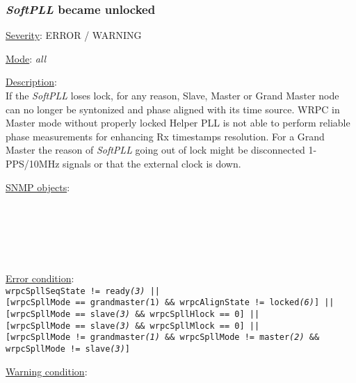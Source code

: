 \subsubsection{\bf \emph{SoftPLL} became unlocked}
		\label{fail:timing:spll_unlock}
		\begin{pck_descr}
			\item [] \underline{Severity}: ERROR / WARNING
			\item [] \underline{Mode}: \emph{all}
			\item [] \underline{Description}:\\
				If the \emph{SoftPLL} loses lock, for any reason, Slave, Master or Grand
				Master node can no longer be syntonized and phase aligned with its time
				source. WRPC in Master mode without properly locked Helper PLL is not
				able to perform reliable phase measurements for enhancing Rx timestamps
				resolution. For a Grand Master the reason of \emph{SoftPLL} going out of
				lock might be disconnected 1-PPS/10MHz signals or that the external
				clock is down.
			\item [] \underline{SNMP objects}:\\
				{\footnotesize
				\\
				\\
				\\
				\\
				\\
				 }
			\item [] \underline{Error condition}:\\
				{\footnotesize
        \texttt{wrpcSpllSeqState != ready\emph{(3)} ||}\\
        \texttt{[wrpcSpllMode == grandmaster\emph(1) \&\& wrpcAlignState != locked\emph{(6)}] ||}\\ %
        \texttt{[wrpcSpllMode == slave\emph{(3)} \&\& wrpcSpllHlock == 0] ||}\\ %
				\texttt{[wrpcSpllMode == slave\emph{(3)} \&\& wrpcSpllMlock == 0] ||}\\ %
        \texttt{[wrpcSpllMode != grandmaster\emph{(1)} \&\& wrpcSpllMode != master\emph{(2)} \&\& wrpcSpllMode != slave\emph{(3)}]}} %
			\item [] \underline{Warning condition}:\\

\end{pck_descr}
